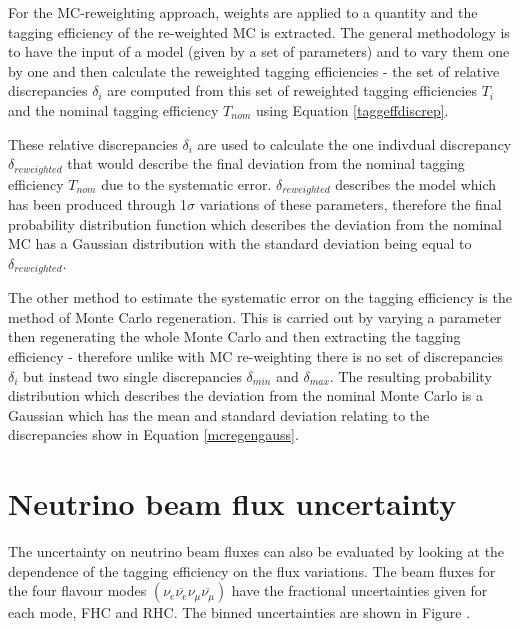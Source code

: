 \documentclass{article}
\begin{document}
For the MC-reweighting approach, weights are applied to a quantity and the tagging efficiency of the re-weighted MC is extracted. The general methodology is to have the input of a model (given by a set of parameters) and to vary them one by one and then calculate the reweighted tagging efficiencies - the set of relative discrepancies $\delta_{i}$ are computed from this set of reweighted tagging efficiencies $T_{i}$ and the nominal tagging efficiency $T_{nom}$ using Equation \eqref{taggeffdiscrep}.


These relative discrepancies $\delta_{i}$ are used to calculate the one indivdual discrepancy $\delta_{reweighted}$ that would describe the final deviation from the nominal tagging efficiency $T_{nom}$ due to the systematic error. $\delta_{reweighted}$ describes the model which has been produced through 1$\sigma$ variations of these parameters, therefore the final probability distribution function which describes the deviation from the nominal MC has a Gaussian distribution with the standard deviation being equal to $\delta_{reweighted}$. 

The other method to estimate the systematic error on the tagging efficiency is the method of Monte Carlo regeneration. This is carried out by varying a parameter then regenerating the whole Monte Carlo and then extracting the tagging efficiency - therefore unlike with MC re-weighting there is no set of discrepancies $\delta_{i}$ but instead two single discrepancies $\delta_{min}$ and $\delta_{max}$. The resulting probability distribution which describes the deviation from the nominal Monte Carlo is a Gaussian which has the mean and standard deviation relating to the discrepancies show in Equation \eqref{mcregengauss}.





\section{Neutrino beam flux uncertainty}

The uncertainty on neutrino beam fluxes can also be evaluated by looking at the dependence of the tagging efficiency on the flux variations. The beam fluxes for the four flavour modes 
$\left(\nu_{e} \overline{\nu_{e}} \nu_{\mu} \overline{\nu_{\mu}}\right)$ have the fractional uncertainties given for each mode, FHC and RHC. The binned uncertainties are shown in Figure .
\end{document}
